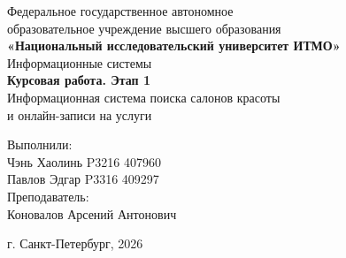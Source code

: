 \begin{titlepage}
\centering
Федеральное государственное автономное \\
образовательное учреждение высшего образования \\
\textbf{«Национальный исследовательский университет ИТМО»} \\

\vfill
Информационные системы\\
\vspace{0.5\baselineskip}
\textbf{Курсовая работа. Этап 1} \\
\vspace{0.5\baselineskip}
Информационная система поиска салонов красоты\\
и онлайн-записи на услуги\\

\vfill
\begin{flushright}
Выполнили:\\
Чэнь Хаолинь P3216 407960\\
Павлов Эдгар P3316 409297\\
Преподаватель:\\
Коновалов Арсений Антонович\\
\end{flushright}

\vspace{4\baselineskip}
\centering
г. Санкт-Петербург, 2026
\end{titlepage}
